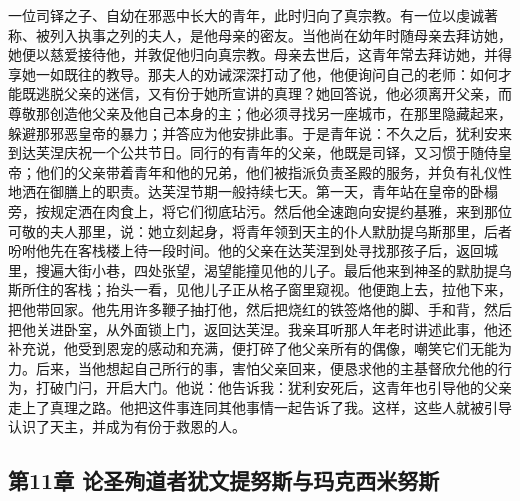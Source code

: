 一位司铎之子、自幼在邪恶中长大的青年，此时归向了真宗教。有一位以虔诚著称、被列入执事之列的夫人，是他母亲的密友。当他尚在幼年时随母亲去拜访她，她便以慈爱接待他，并敦促他归向真宗教。母亲去世后，这青年常去拜访她，并得享她一如既往的教导。那夫人的劝诫深深打动了他，他便询问自己的老师：如何才能既逃脱父亲的迷信，又有份于她所宣讲的真理？她回答说，他必须离开父亲，而尊敬那创造他父亲及他自己本身的主；他必须寻找另一座城市，在那里隐藏起来，躲避那邪恶皇帝的暴力；并答应为他安排此事。于是青年说：不久之后，犹利安来到达芙涅庆祝一个公共节日。同行的有青年的父亲，他既是司铎，又习惯于随侍皇帝；他们的父亲带着青年和他的兄弟，他们被指派负责圣殿的服务，并负有礼仪性地洒在御膳上的职责。达芙涅节期一般持续七天。第一天，青年站在皇帝的卧榻旁，按规定洒在肉食上，将它们彻底玷污。然后他全速跑向安提约基雅，来到那位可敬的夫人那里，说：她立刻起身，将青年领到天主的仆人默肋提乌斯那里，后者吩咐他先在客栈楼上待一段时间。他的父亲在达芙涅到处寻找那孩子后，返回城里，搜遍大街小巷，四处张望，渴望能撞见他的儿子。最后他来到神圣的默肋提乌斯所住的客栈；抬头一看，见他儿子正从格子窗里窥视。他便跑上去，拉他下来，把他带回家。他先用许多鞭子抽打他，然后把烧红的铁签烙他的脚、手和背，然后把他关进卧室，从外面锁上门，返回达芙涅。我亲耳听那人年老时讲述此事，他还补充说，他受到恩宠的感动和充满，便打碎了他父亲所有的偶像，嘲笑它们无能为力。后来，当他想起自己所行的事，害怕父亲回来，便恳求他的主基督欣允他的行为，打破门闩，开启大门。他说：他告诉我：犹利安死后，这青年也引导他的父亲走上了真理之路。他把这件事连同其他事情一起告诉了我。这样，这些人就被引导认识了天主，并成为有份于救恩的人。\par


\subsection{第11章 论圣殉道者犹文提努斯与玛克西米努斯}

